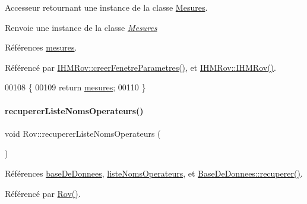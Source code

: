 Accesseur retournant une instance de la classe \hyperlink{class_mesures}{Mesures}.

\begin{DoxyReturn}{Renvoie}
une instance de la classe {\itshape \hyperlink{class_mesures}{Mesures}} 
\end{DoxyReturn}


Références \hyperlink{class_rov_af37589b38493e4bd99702587db2d28a8}{mesures}.



Référencé par \hyperlink{class_i_h_m_rov_aed451139ac09ef18b7c92637761d80ce}{I\+H\+M\+Rov\+::creer\+Fenetre\+Parametres()}, et \hyperlink{class_i_h_m_rov_a5dac1fb4612866cc61f699a415e0ef6b}{I\+H\+M\+Rov\+::\+I\+H\+M\+Rov()}.


\begin{DoxyCode}
00108 \{
00109     \textcolor{keywordflow}{return} \hyperlink{class_rov_af37589b38493e4bd99702587db2d28a8}{mesures};
00110 \}
\end{DoxyCode}
\mbox{\label{class_rov_a490eefb90bf28e83f181d770f0f52446}} 
\paragraph{\texorpdfstring{recuperer\+Liste\+Noms\+Operateurs()}{recupererListeNomsOperateurs()}}
{\footnotesize\ttfamily void Rov\+::recuperer\+Liste\+Noms\+Operateurs (\begin{DoxyParamCaption}{ }\end{DoxyParamCaption})\hspace{0.3cm}{\ttfamily [private]}}



Références \hyperlink{class_rov_a5a9a824cd100947c75d0951eb9e1f90c}{base\+De\+Donnees}, \hyperlink{class_rov_a3d424033e0ff00f480a711358ef4fde6}{liste\+Noms\+Operateurs}, et \hyperlink{class_base_de_donnees_a77539baad389f5acf754cd2cd452403e}{Base\+De\+Donnees\+::recuperer()}.



Référencé par \hyperlink{class_rov_a5dddd3bd156c134848078296087d090c}{Rov()}.


